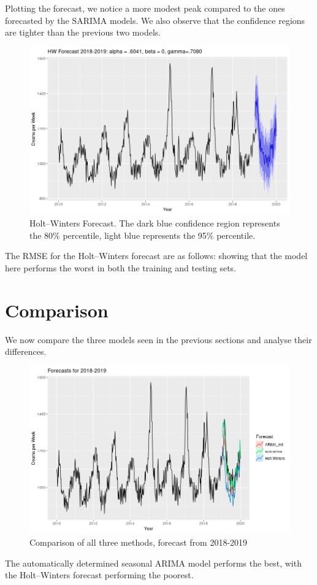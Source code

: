 \documentclass[a4paper, oneside]{discothesis}
\begin{document}
Plotting the forecast, we notice a more modest peak compared to the ones forecasted by the SARIMA models. We also observe that the confidence regions are tighter than the previous two models.
\begin{figure}[H]
\centering
\includegraphics[width=.83\textwidth]{figures/hw_forecast.png}
\caption{Holt--Winters Forecast. The dark blue confidence region represents the 80\% percentile, light blue represents the 95\% percentile.}
\end{figure}
The RMSE for the Holt--Winters forecast are as follows:
 showing that the model here performs the worst in both the training and testing sets.
\newpage
\section{Comparison}
We now compare the three models seen in the previous sections and analyse their differences.
\begin{figure}[H]
\centering
\includegraphics[width=.9\textwidth]{figures/all_2019.png}
\caption{Comparison of all three methods, forecast from 2018-2019}
\end{figure}
The automatically determined seasonal ARIMA model performs the best, with the Holt--Winters forecast performing the poorest.
\end{document}
